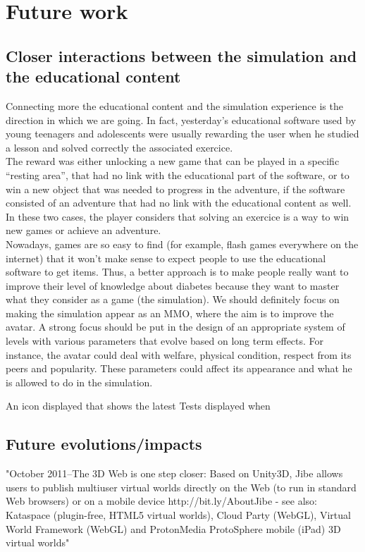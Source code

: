 \section{Future work}

    \subsection{Closer interactions between the simulation and the educational content}
Connecting more the educational content and the simulation experience is the direction in which we are going. In fact, yesterday's educational software used by young teenagers and adolescents were usually rewarding the user when he studied a lesson and solved correctly the associated exercice. \\
The reward was either unlocking a new game that can be played in a specific ``resting area'', that had no link with the educational part of the software, or to win a new object that was needed to progress in the adventure, if the software consisted of an adventure that had no link with the educational content as well. In these two cases, the player considers that solving an exercice is a way to win new games or achieve an adventure.\\
Nowadays, games are so easy to find (for example, flash games everywhere on the internet) that it won't make sense to expect people to use the educational software to get items. Thus, a better approach is to make people really want to improve their level of knowledge about diabetes because they want to master what they consider as a game (the simulation). We should definitely focus on making the simulation appear as an MMO, where the aim is to improve the avatar. A strong focus should be put in the design of an appropriate system of levels with various parameters that evolve based on long term effects. For instance, the avatar could deal with welfare, physical condition, respect from its peers and popularity. These parameters could affect its appearance and what he is allowed to do in the simulation.

An icon displayed that shows the latest 
Tests displayed when

    \subsection{Future evolutions/impacts}
    "October 2011--The 3D Web is one step closer: Based on Unity3D, Jibe allows users to publish multiuser virtual worlds directly on the Web (to run in standard Web browsers) or on a mobile device http://bit.ly/AboutJibe - see also: Kataspace (plugin-free, HTML5 virtual worlds), Cloud Party (WebGL), Virtual World Framework (WebGL) and ProtonMedia ProtoSphere mobile (iPad) 3D virtual worlds"

